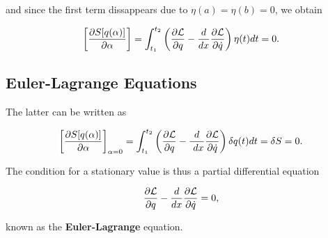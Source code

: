 \documentclass[%
oneside,                 %
final,                   %
10pt]{article}
\begin{document}
and since the first term dissappears due to $\eta(a)=\eta(b)=0$, we obtain

\[
\left[\frac{\partial  S[q(\alpha)]}{\partial \alpha}\right]=\int_{t_1}^{t_2} \left( \frac{\partial {\cal L}}{\partial q}-\frac{d}{dx}\frac{\partial {\cal L}}{\partial \dot{q}}
\right)\eta(t)dt=0.
\]

\subsection{Euler-Lagrange Equations}

The latter can be written as

\[
\left[\frac{\partial  S[q(\alpha)]}{\partial \alpha}\right]_{\alpha=0}=\int_{t_1}^{t_2} \left( \frac{\partial {\cal L}}{\partial q}-\frac{d}{\
dx}\frac{\partial {\cal L}}{\partial \dot{q}}\right)\delta q(t)dt=\delta S = 0.
\]

The condition for a stationary value is thus a partial differential equation

\[
\frac{\partial {\cal L}}{\partial q}-\frac{d}{dx}\frac{\partial {\cal L}}{\partial \dot{q}}=0,
\]

known as the \textbf{Euler-Lagrange} equation.



\end{document}
